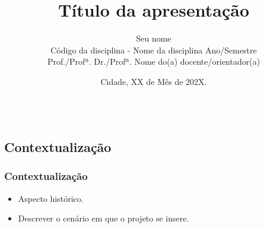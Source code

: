 \documentclass[hyperref={colorlinks=true,    
allcolors = blue,citecolor=blue}]{beamer} %
\title[seuemail@gmail.com]{Título da apresentação}
\date{Cidade, XX de Mês de 202X.}
\author[Sigla da Faculdade]{Seu nome \\ \vspace{0.59cm}
Código da disciplina - Nome da disciplina Ano/Semestre\\
Prof./Profª. Dr./Profª. Nome do(a) docente/orientador(a)}
\begin{document}
 
\begin{frame}
	\titlepage	
\end{frame}
\begin{frame}
    \begin{columns}[onlytextwidth,T]
    \begin{column}{.45\textwidth}
    \tableofcontents[sections=1-4]
    \end{column}
    \begin{column}{.45\textwidth}
    \tableofcontents[sections=5-9]
\end{column}    
\end{columns}
\end{frame}	
\begin{frame}
\section{Contextualização}
\frametitle{Contextualização}

\begin{itemize}
    \item Aspecto histórico.
    \item Descrever o cenário em que o projeto se insere.
\end{itemize}

\end{frame}
\end{document}
